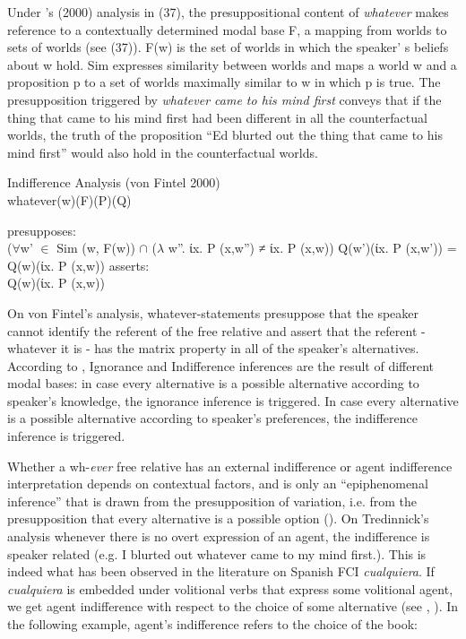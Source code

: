 \documentclass[output=paper
,modfonts
,nonflat]{langsci/langscibook}
\begin{document}
Under \citeauthor{Fintel2000}’s (2000) analysis in (37), the presuppositional content of \textit{whatever} makes reference to a contextually determined modal base F, a mapping from worlds to sets of worlds (see (37)). F(w) is the set of worlds in which the speaker' s beliefs about w hold. Sim expresses similarity between worlds and maps a world w and a proposition p to a set of worlds maximally similar to w in which p is true. The presupposition triggered by \textit{whatever came to his mind first} conveys that if the thing that came to his mind first had been different in all the counterfactual worlds, the truth of the proposition “Ed blurted out the thing that came to his mind first” would also hold in the counterfactual worlds.

\ea Indifference Analysis (von Fintel 2000)\\
whatever(w)(F)(P)(Q)
\begin{xlist}
\ex presupposes:\\
{($\forall$w’ $\in$ Sim (w, F(w)) $\cap$ ($\lambda$ w”. ίx. P (x,w”) ≠ ίx. P (x,w)) 
	Q(w’)(ίx. P (x,w’)) = Q(w)(ίx. P (x,w))} 
\ex	asserts:\\
{Q(w)(ίx. P (x,w))}
\end{xlist}
\z

On von Fintel’s analysis, whatever-statements presuppose that the speaker cannot identify the referent of the free relative and assert that the referent - whatever it is - has the matrix property in all of the speaker's alternatives. According to \cite{Fintel2000}, Ignorance and Indifference inferences are the result of different modal bases: in case every alternative is a possible alternative according to speaker’s knowledge, the ignorance inference is triggered. In case every alternative is a possible alternative according to speaker's preferences, the indifference inference is triggered.

Whether a wh-\textit{ever} free relative has an external indifference or agent indifference interpretation depends on contextual factors, and is only an “epiphenomenal inference” that is drawn from the presupposition of variation, i.e. from the presupposition that every alternative is a possible option (\citealt[108]{Tredinnick2005}). On Tredinnick’s analysis whenever there is no overt expression of an agent, the indifference is speaker related (e.g. I blurted out whatever came to my mind first.). This is indeed what has been observed in the literature on Spanish FCI \textit{cualquiera}. If \textit{cualquiera} is embedded under volitional verbs that express some volitional agent, we get agent indifference with respect to the choice of some alternative (see \citealt{CR2008}, \citealt{AM2011}). In the following example, agent’s indifference refers to the choice of the book:
\end{document}
